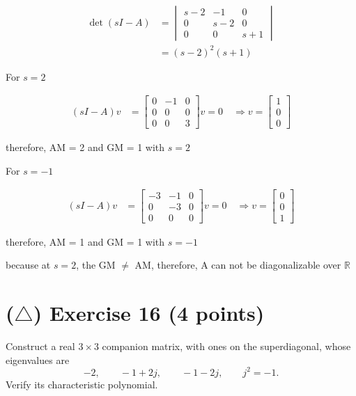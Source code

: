 \documentclass[12pt,a4paper]{article}
\begin{document}
\begin{align*}
	\det(sI - A) &= \begin{vmatrix}
		s - 2 & -1 & 0 \\
		0 & s - 2 &  0 \\
		0 & 0 & s + 1 
	\end{vmatrix} \\
	&= (s-2)^2 (s + 1)
\end{align*}

For $s = 2$

\begin{align*}
	(sI - A)v &= \begin{bmatrix}
		0 & -1 & 0 \\
		0 & 0 & 0 \\
		0 & 0 & 3
	\end{bmatrix}v = 0\quad \Rightarrow v = \begin{bmatrix}
	1 \\ 0 \\ 0
	\end{bmatrix}
\end{align*}

therefore, AM = 2 and GM = 1 with $s = 2$


\vspace{1cm}
For $ s= -1$

\begin{align*}
	(sI - A) v &= \begin{bmatrix}
		-3 & -1 & 0 \\
		0 & -3  & 0 \\
		0 & 0 & 0
	\end{bmatrix}v = 0 \quad \Rightarrow v = \begin{bmatrix}
	0 \\ 0 \\ 1
	\end{bmatrix}
\end{align*}

therefore, AM = 1 and GM = 1 with $s = -1$

because at $s = 2$, the GM $\neq$ AM, therefore, A can not be diagonalizable over $\mathbb R$
\vspace{3cm}
\vfill
\section*{($\triangle$) Exercise 16 \hfill {\normalsize (4 points)}}
Construct a real $3\times3$ companion matrix, with ones on the superdiagonal, whose eigenvalues are
\[
-2,\qquad -1+2j,\qquad -1-2j,\qquad j^2=-1.
\]
Verify its characteristic polynomial.
\end{document}
